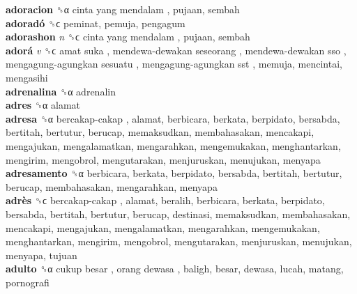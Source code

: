\textbf{adoracion} ␝α   cinta yang mendalam , pujaan, sembah  \\
\textbf{adoradó} ␝ϲ  peminat, pemuja, pengagum  \\
\textbf{adorashon} \emph{n}  ␝ϲ   cinta yang mendalam , pujaan, sembah  \\
\textbf{adorá} \emph{v}  ␝ϲ   amat suka ,  mendewa-dewakan seseorang ,  mendewa-dewakan sso ,  mengagung-agungkan sesuatu ,  mengagung-agungkan sst , memuja, mencintai, mengasihi  \\
\textbf{adrenalina} ␝α  adrenalin  \\
\textbf{adres} ␝α  alamat  \\
\textbf{adresa} ␝α   bercakap-cakap , alamat, berbicara, berkata, berpidato, bersabda, bertitah, bertutur, berucap, memaksudkan, membahasakan, mencakapi, mengajukan, mengalamatkan, mengarahkan, mengemukakan, menghantarkan, mengirim, mengobrol, mengutarakan, menjuruskan, menujukan, menyapa  \\
\textbf{adresamento} ␝α  berbicara, berkata, berpidato, bersabda, bertitah, bertutur, berucap, membahasakan, mengarahkan, menyapa  \\
\textbf{adrès} ␝ϲ   bercakap-cakap , alamat, beralih, berbicara, berkata, berpidato, bersabda, bertitah, bertutur, berucap, destinasi, memaksudkan, membahasakan, mencakapi, mengajukan, mengalamatkan, mengarahkan, mengemukakan, menghantarkan, mengirim, mengobrol, mengutarakan, menjuruskan, menujukan, menyapa, tujuan  \\
\textbf{adulto} ␝α   cukup besar ,  orang dewasa , baligh, besar, dewasa, lucah, matang, pornografi  \\
